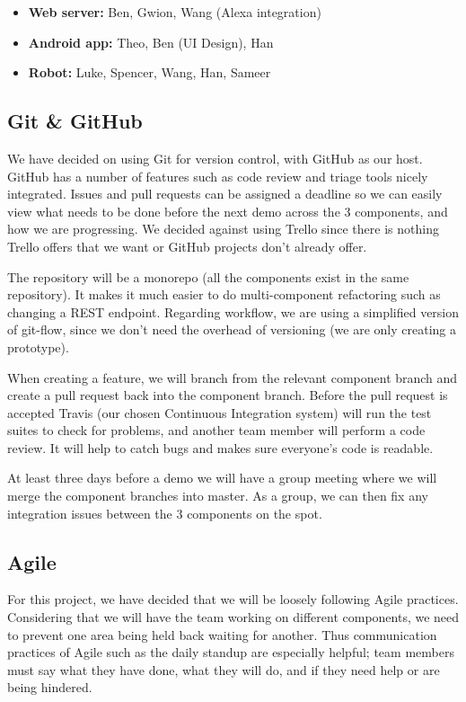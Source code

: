 \documentclass[onecolumn]{IEEEtran}
\begin{document}
\begin{itemize}
    \item \textbf{Web server:} Ben, Gwion, Wang (Alexa integration)
    \item \textbf{Android app: } Theo, Ben (UI Design), Han
    \item \textbf{Robot: } Luke, Spencer, Wang, Han, Sameer
\end{itemize}

\subsection{Git \& GitHub}

We have decided on using Git for version control, with GitHub as our host. GitHub has a number of features such as code review and triage tools nicely integrated. Issues and pull requests can be assigned a deadline so we can easily view what needs to be done before the next demo across the 3 components, and how we are progressing. We decided against using Trello since there is nothing Trello offers that we want or GitHub projects don’t already offer.

The repository will be a monorepo (all the components exist in the same repository). It makes it much easier to do multi-component refactoring such as changing a REST endpoint. Regarding workflow, we are using a simplified version of git-flow, since we don’t need the overhead of versioning (we are only creating a prototype).

When creating a feature, we will branch from the relevant component branch and create a pull request back into the component branch. Before the pull request is accepted Travis (our chosen Continuous Integration system) will run the test suites to check for problems, and another team member will perform a code review. It will help to catch bugs and makes sure everyone's code is readable.

At least three days before a demo we will have a group meeting where we will merge the component branches into master. As a group, we can then fix any integration issues between the 3 components on the spot.

\subsection{Agile}

For this project, we have decided that we will be loosely following Agile practices. Considering that we will have the team working on different components, we need to prevent one area being held back waiting for another. Thus communication practices of Agile such as the daily standup are especially helpful; team members must say what they have done, what they will do, and if they need help or are being hindered. 
\end{document}
